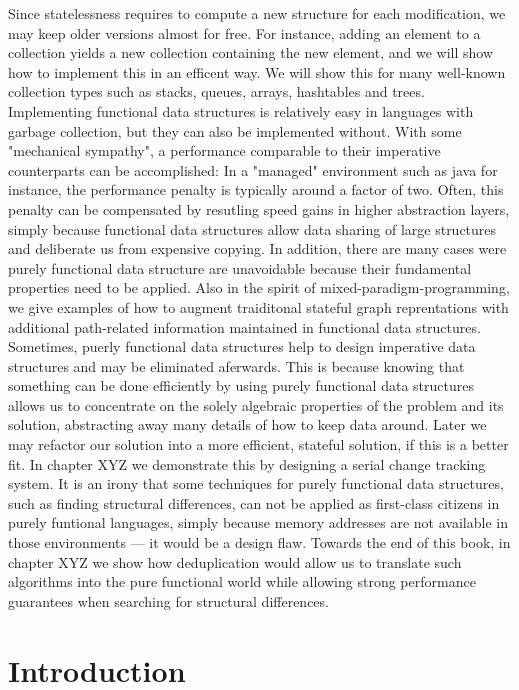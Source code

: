 \documentclass{book}
\begin{document}
Since statelessness requires to compute a new structure for each modification, we may keep older versions almost for free. For instance, adding an element to a collection yields a new collection containing the new element, and we will show how to implement this in an efficent way. We will show this for many well-known collection types such as stacks, queues, arrays, hashtables and trees. Implementing functional data structures is relatively easy in languages with garbage collection, but they can also be implemented without. With some "mechanical sympathy", a performance comparable to their imperative counterparts can be accomplished: In a "managed" environment such as java for instance,  the performance penalty is typically around a factor of two. Often, this penalty can be compensated by resutling speed gains in higher abstraction layers, simply because functional data structures allow data sharing of large structures and deliberate us from expensive copying. In addition, there are many cases were purely functional data structure are unavoidable because their
fundamental properties need to be applied.  Also in the spirit of mixed-paradigm-programming, we give examples of how to augment traiditonal stateful graph reprentations with additional path-related information maintained in functional data structures.
Sometimes, puerly functional data structures help to design imperative data structures and may be eliminated aferwards. This is because knowing that something can be done efficiently by using purely functional data structures allows us to concentrate on the solely algebraic properties of the problem and its solution, abstracting away many details of how to keep data around. Later we may  refactor our solution into a more efficient, stateful solution, if this is a better fit. In chapter XYZ we demonstrate this by designing a serial change tracking system. 
 It is an irony that some techniques for purely functional data structures, such as finding structural differences,  can not be applied as first-class citizens in purely funtional languages, simply because memory addresses are not available in those environments --- it would be a design flaw. Towards the end of this book, in chapter XYZ we show how  deduplication would allow us to translate such algorithms into the pure functional world while allowing strong performance guarantees when searching for structural differences. 


\chapter{Introduction}
\end{document}
